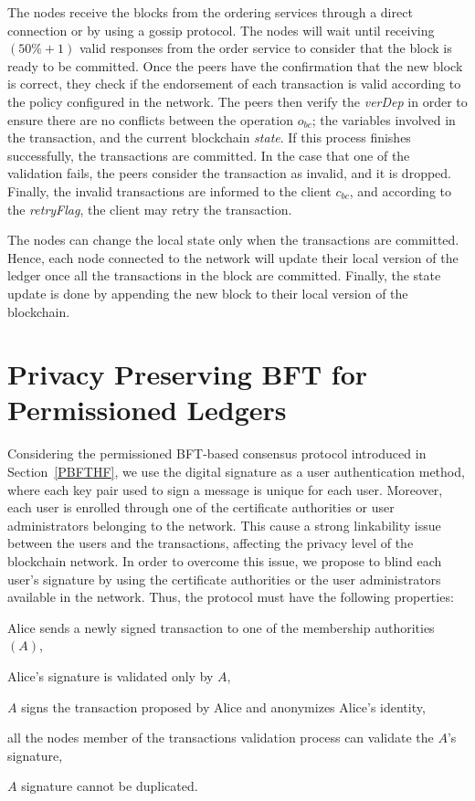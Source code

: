 \documentclass[conference]{llncs}
\begin{document}
The nodes receive the blocks from the ordering services through a direct connection or by using a gossip protocol. The nodes will wait until receiving $(50\%+1)$ valid responses from the order service to consider that the block is ready to be committed. Once the peers have the confirmation that the new block is correct, they check if the endorsement of each transaction is valid according to the policy configured in the network. The peers then verify the \textit{verDep} in order to ensure there are no conflicts between the operation $o_{bc}$; the variables involved in the transaction, and the current blockchain \textit{state}. If this process finishes successfully, the transactions are committed. In the case that one of the validation fails, the peers consider the transaction as invalid, and it is dropped. Finally, the invalid transactions are informed to the client $c_{bc}$, and according to the \textit{retryFlag}, the client may retry the transaction.

The nodes can change the local state only when the transactions are committed. Hence, each node connected to the network will update their local version of the ledger once all the transactions in the block are committed. Finally, the state update is done by appending the new block to their local version of the blockchain.

\section{Privacy Preserving BFT for Permissioned Ledgers}\label{PPPBFT}

Considering the permissioned BFT-based consensus protocol introduced in Section~\ref{PBFTHF}, we use the digital signature as a user authentication method, where each key pair used to sign a message is unique for each user. Moreover, each user is enrolled through one of the certificate authorities or user administrators belonging to the network. This cause a strong linkability issue between the users and the transactions, affecting the privacy level of the blockchain network. In order to overcome this issue, we propose to blind each user's signature by using the certificate authorities or the user administrators available in the network. Thus, the protocol must have the following properties:  

\begin{compactitem}
    \item Alice sends a newly signed transaction to one of the membership authorities $(A)$,
    \item Alice’s signature is validated only by $A$,
    \item $A$ signs the transaction proposed by Alice and anonymizes Alice’s identity,
    \item all the nodes member of the transactions validation process can validate the $A$'s signature,
    \item $A$ signature cannot be duplicated.
\end{compactitem}
\end{document}
